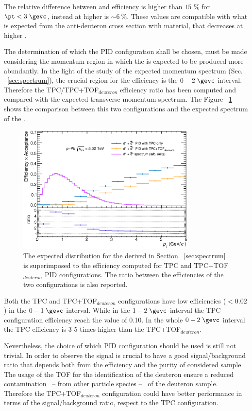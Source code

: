 The relative difference between \ds and \dsbar efficiency is higher than $15$ \% for 
$\pt < 3\;\gevc$, instead at higher \pt is $\sim 6\ $\%. 
These values are compatible with what is expected from the anti-deuteron cross section with material,
that decreases at higher \pt.

The determination of which the PID configuration shall be chosen,
must be made considering the momentum region in which the \ds is expected to be produced more 
abundantly.
In the light of the study of the expected \ds momentum spectrum (Sec. ~\ref{sec:spectrum}), the 
crucial region for the efficiency is the $0 - 2\;\gevc$ \pt interval.
Therefore the TPC/TPC+TOF$_{deuteron}$ efficiency ratio has been computed and compared with the expected
\ds transverse momentum spectrum.
The Figure ~\ref{fig:eff_spec} shows the comparison between this two configurations and the expected \pt
spectrum of the \ds.

\begin{figure}
    \centering
    \includegraphics[width=0.8\textwidth]{gfx/effspecSLIM}
	\caption{The expected \pt distribution for the \ds derived in Section ~\ref{sec:spectrum} is superimposed to the efficiency computed for TPC and TPC+TOF$_{deuteron}$ PID configurations. The ratio between the efficiencies of the two configurations is also reported.}
	\label{fig:eff_spec}
\end{figure}

Both the TPC and TPC+TOF$_{deuteron}$ configurations have low efficiencies ($< 0.02$) in the $0 - 1\;\gevc$
interval. While in the $1 - 2\;\gevc$ interval the TPC configuration efficiency reach the value of 0.10.
In the whole $0 - 2\;\gevc$ interval the TPC efficiency is 3-5 times higher than the TPC+TOF$_{deuteron}$.

Nevertheless, the choice of which PID configuration should be used is still not trivial. 
In order to observe the \ds signal is crucial to have a good signal/background ratio that depends
both from the efficiency and the purity of considered sample.
The usage of the TOF for the identification of the deuteron ensure a reduced contamination \ -- from 
other particle species -- \ of the deuteron sample. 
Therefore the TPC+TOF$_{deuteron}$ configuration could have better performance in terms of the 
signal/background ratio, respect to the TPC configuration.

